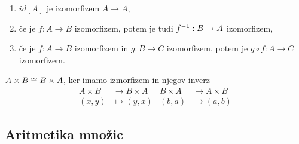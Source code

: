 \begin{dokaz}
  \begin{enumerate}
     \item $id[A]$ je izomorfizem $A \to A$,
     \item če je $f : A \to B$ izomorfizem, potem je tudi ${f}^{-1} : B \to A$ izomorfizem,
     \item če je $f : A \to B$ izomorfizem in $g : B \to C$ izomorfizem, potem je $g \circ f : A \to C$ izomorfizem.
  \end{enumerate}
\end{dokaz}

\begin{primer}
  $A \times B \cong B \times A$, ker imamo izmorfizem in njegov inverz
  \begin{align*}
    A \times B  &\to  B \times A      &    B \times A  &\to  A \times B \\
    (x, y) &\mapsto  (y, x)           &    (b, a) &\mapsto  (a, b)
  \end{align*}
\end{primer}

\subsection{Aritmetika množic}

